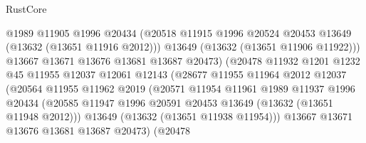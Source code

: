 \begin{lexlean}{RustCore}
\begin{coremodule}
                                  @1989
                                  @11905
                                  @1996
                                  @20434
                                  (@20518
                                    @11915
                                    @1996
                                    @20524
                                    @20453
                                    @13649
                                    (@13632 (@13651 @11916 @2012)))
                                  @13649
                                  (@13632 (@13651 @11906 @11922)))
                                @13667
                                @13671
                                @13676
                                @13681
                                @13687
                                @20473)
                              (@20478
                                @11932
                                @1201
                                @1232
                                @45
                                @11955
                                @12037
                                @12061
                                @12143
                                (@28677
                                  @11955
                                  @11964
                                  @2012
                                  @12037
                                  (@20564
                                    @11955
                                    @11962
                                    @2019
                                    (@20571
                                      @11954
                                      @11961
                                      @1989
                                      @11937
                                      @1996
                                      @20434
                                      (@20585
                                        @11947
                                        @1996
                                        @20591
                                        @20453
                                        @13649
                                        (@13632 (@13651 @11948 @2012)))
                                      @13649
                                      (@13632 (@13651 @11938 @11954)))
                                    @13667
                                    @13671
                                    @13676
                                    @13681
                                    @13687
                                    @20473)
                                  (@20478

\end{coremodule}
\end{lexlean}

